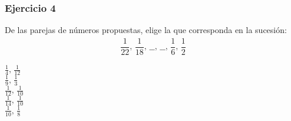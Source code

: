 \begin{frame}
\frametitle{Ejercicio 4}
De las parejas de números propuestas, elige la que corresponda en la sucesión:
\begin{align*}
\dfrac{1}{22}, \, \dfrac{1}{18}, \, \_\_ , \, \_\_, \, \dfrac{1}{6}, \, \dfrac{1}{2}
\end{align*}
\begin{choices}
\choice $\frac{1}{4}, \, \frac{1}{12}$ \\
\choice $\frac{1}{9}, \, \frac{1}{3}$ \\
\choice $\frac{1}{12}, \, \frac{1}{10}$ \\
\choice $\frac{1}{14}, \, \frac{1}{10}$ \\
\choice $\frac{1}{10}, \, \frac{1}{8}$ \\
\end{choices} 
\end{frame}

